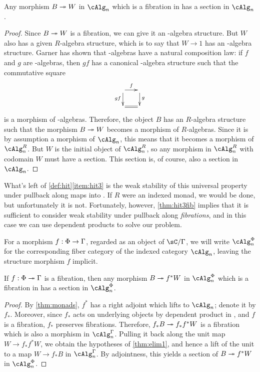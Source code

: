 \documentclass{amsart}
\begin{document}
\begin{lem}\label{thm:elim1}
  Any morphism $B\twoheadrightarrow W$ in $\cAlg_n$ which is a fibration in \sC has a section in $\cAlg_n$.
\end{lem}
\begin{proof}
  Since $B\twoheadrightarrow W$ is a fibration, we can give it an \lR-algebra structure.
  But $W$ also has a given $R$-algebra structure, which is to say that $W\to 1$ has an \lR-algebra structure.
  Garner has shown that \lR-algebras have a natural composition law: if $f$ and $g$ are \lR-algebras, then $gf$ has a canonical \lR-algebra structure such that the commutative square
  \begin{equation}
  \vcenter{\xymatrix@-.5pc{
      \ar[r]^f\ar[d]_{gf} &
      \ar[d]^g\\
      \ar@{=}[r] &
      }}
  \end{equation}
  is a morphism of \lR-algebras.
  Therefore, the object $B$ has an $R$-algebra structure such that the morphism $B\twoheadrightarrow W$ becomes a morphism of $R$-algebras.
  Since it is by assumption a morphism of $\cAlg_n$, this means that it becomes a morphism of $\cAlg_n^R$.
  But $W$ is the initial object of $\cAlg_n^R$, so any morphism in $\cAlg_n^R$ with codomain $W$ must have a section.
  This section is, of course, also a section in $\cAlg_n$.
\end{proof}

What's left of \autoref{def:hit}\ref{item:hit3} is the weak stability of this universal property under pullback along maps into \Gamma.
If $R$ were an indexed monad, we would be done, but unfortunately it is not.
Fortunately, however, \autoref{thm:hit3fib} implies that it is sufficient to consider weak stability under pullback along \emph{fibrations}, and in this case we can use dependent products to solve our problem.

For a morphism $f:\Phi \to\Gamma$, regarded as an object of $\sC/\Gamma$, we will write $\cAlg_n^\Phi$ for the corresponding fiber category of the indexed category $\cAlg_n$, leaving the structure morphism $f$ implicit.

\begin{lem}\label{thm:elim2}
  If $f:\Phi \twoheadrightarrow\Gamma$ is a fibration, then any morphism $B\twoheadrightarrow f^* W$ in $\cAlg_n^\Phi$ which is a fibration in \sC has a section in $\cAlg_n^\Phi$.
\end{lem}
\begin{proof}
  By \autoref{thm:monads}, $f^*$ has a right adjoint which lifts to $\cAlg_n$; denote it by $f_*$.
  Moreover, since $f_*$ acts on underlying objects by dependent product in \sC, and $f$ is a fibration, $f_*$ preserves fibrations.
  Therefore, $f_* B \twoheadrightarrow f_* f^* W$ is a fibration which is also a morphism in $\cAlg_n^\Gm$.
  Pulling it back along the unit map $W \to f_* f^* W$, we obtain the hypotheses of \autoref{thm:elim1}, and hence a lift of the unit to a map $W \to f_* B$ in $\cAlg_n^\Gm$.
  By adjointness, this yields a section of $B\twoheadrightarrow f^* W$ in $\cAlg_n^\Phi$.
\end{proof}
\end{document}
